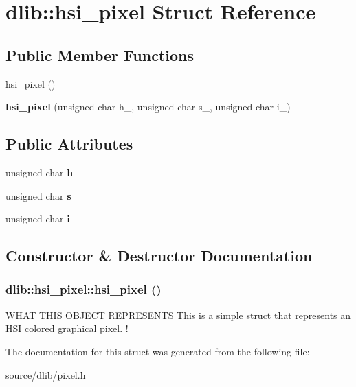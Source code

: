 \hypertarget{structdlib_1_1hsi__pixel}{
\section{dlib::hsi\_\-pixel Struct Reference}
\label{structdlib_1_1hsi__pixel}
}
\subsection*{Public Member Functions}
\begin{DoxyCompactItemize}
\item 
\hyperlink{structdlib_1_1hsi__pixel_a0c0e3a9cdcb8467326a256b897e1bd24}{hsi\_\-pixel} ()
\item 
\hypertarget{structdlib_1_1hsi__pixel_a46fe4b177588375562346727ba8f850e}{
{\bfseries hsi\_\-pixel} (unsigned char h\_\-, unsigned char s\_\-, unsigned char i\_\-)}
\label{structdlib_1_1hsi__pixel_a46fe4b177588375562346727ba8f850e}

\end{DoxyCompactItemize}
\subsection*{Public Attributes}
\begin{DoxyCompactItemize}
\item 
\hypertarget{structdlib_1_1hsi__pixel_af1db1e3a8cd094907b9c8304d3a8976b}{
unsigned char {\bfseries h}}
\label{structdlib_1_1hsi__pixel_af1db1e3a8cd094907b9c8304d3a8976b}

\item 
\hypertarget{structdlib_1_1hsi__pixel_acd183911f61c335fcac35d429bdf33da}{
unsigned char {\bfseries s}}
\label{structdlib_1_1hsi__pixel_acd183911f61c335fcac35d429bdf33da}

\item 
\hypertarget{structdlib_1_1hsi__pixel_a541e836f07fd6d3b9425e45e291e2f8b}{
unsigned char {\bfseries i}}
\label{structdlib_1_1hsi__pixel_a541e836f07fd6d3b9425e45e291e2f8b}

\end{DoxyCompactItemize}


\subsection{Constructor \& Destructor Documentation}
\hypertarget{structdlib_1_1hsi__pixel_a0c0e3a9cdcb8467326a256b897e1bd24}{
\subsubsection[{hsi\_\-pixel}]{\setlength{\rightskip}{0pt plus 5cm}dlib::hsi\_\-pixel::hsi\_\-pixel ()}}
\label{structdlib_1_1hsi__pixel_a0c0e3a9cdcb8467326a256b897e1bd24}
WHAT THIS OBJECT REPRESENTS This is a simple struct that represents an HSI colored graphical pixel. ! 

The documentation for this struct was generated from the following file:\begin{DoxyCompactItemize}
\item 
source/dlib/pixel.h\end{DoxyCompactItemize}
